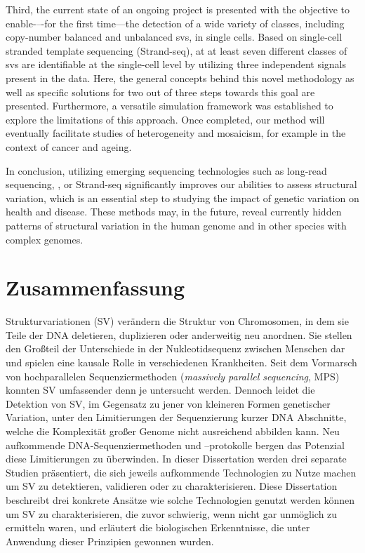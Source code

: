 Third, the current state of an ongoing project is presented with the objective
to enable-–-for the first time---the detection of a wide variety of \sv classes,
including copy-number balanced and unbalanced \acp{sv}, in single cells. Based on
single-cell stranded template sequencing (Strand-seq), at at least seven different
classes of \acp{sv} are identifiable at the single-cell level by utilizing three
independent signals present in the data. Here, the general concepts behind this
novel methodology as well as specific solutions for two out of
three steps towards this goal are presented. Furthermore, a versatile simulation
framework was established to explore the limitations of this approach.
Once completed, our method will eventually facilitate studies of \sv
heterogeneity and mosaicism, for example in the context of cancer and ageing.

In conclusion, utilizing emerging sequencing technologies such as long-read
sequencing, \hic, or Strand-seq significantly improves our abilities to assess
structural variation, which is an essential step to studying the impact of
genetic variation on health and disease. These methods may, in
the future, reveal currently hidden patterns of structural variation in the
human genome and in other species with complex genomes.




\cleardoublepage
{}
\chapter*{Zusammenfassung}%
%

Strukturvariationen (SV) verändern die Struktur von Chromosomen, in dem sie
Teile der DNA deletieren, duplizieren oder anderweitig neu anordnen. Sie stellen
den Großteil der Unterschiede in der Nukleotidsequenz zwischen Menschen dar und
spielen eine kausale Rolle in verschiedenen Krank\-hei\-ten. Seit dem Vormarsch
von hochparallelen Sequenziermethoden (\textit{massively parallel sequencing},
MPS) konnten SV umfassender denn je untersucht werden. Dennoch leidet die Detektion von
SV, im Gegensatz zu jener von kleineren Formen genetischer Variation, unter den
Limitierungen der Sequenzierung kurzer DNA Abschnitte, welche die Komplexität
großer Genome nicht ausreichend abbilden kann. Neu aufkommende
DNA-Se\-quen\-zier\-me\-tho\-den und –protokolle bergen das Potenzial diese Limitierungen
zu überwinden. In dieser Dissertation werden drei separate Studien präsentiert,
die sich jeweils aufkommende Technologien zu Nutze machen um SV zu detektieren,
validieren oder zu charakterisieren. Diese
Dissertation beschreibt drei konkrete Ansätze wie solche Technologien genutzt
werden können um SV zu charakterisieren, die zuvor schwierig, wenn nicht gar
unmöglich zu ermitteln waren, und erläutert die biologischen Erkenntnisse, die
unter Anwendung dieser Prinzipien gewonnen wurden.

